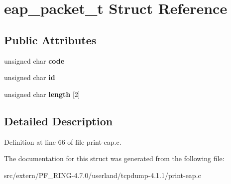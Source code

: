 \hypertarget{structeap__packet__t}{
\section{eap\_\-packet\_\-t Struct Reference}
\label{structeap__packet__t}
}
\subsection*{Public Attributes}
\begin{DoxyCompactItemize}
\item 
\hypertarget{structeap__packet__t_a78f987f329f6e642c21d0dc1ef5c9ab9}{
unsigned char {\bfseries code}}
\label{structeap__packet__t_a78f987f329f6e642c21d0dc1ef5c9ab9}

\item 
\hypertarget{structeap__packet__t_af079903daa5c65a7433b7b70ee71b44a}{
unsigned char {\bfseries id}}
\label{structeap__packet__t_af079903daa5c65a7433b7b70ee71b44a}

\item 
\hypertarget{structeap__packet__t_af60c79440118af1f44141a019d9380e7}{
unsigned char {\bfseries length} \mbox{[}2\mbox{]}}
\label{structeap__packet__t_af60c79440118af1f44141a019d9380e7}

\end{DoxyCompactItemize}


\subsection{Detailed Description}


Definition at line 66 of file print-\/eap.c.



The documentation for this struct was generated from the following file:\begin{DoxyCompactItemize}
\item 
src/extern/PF\_\-RING-\/4.7.0/userland/tcpdump-\/4.1.1/print-\/eap.c\end{DoxyCompactItemize}
